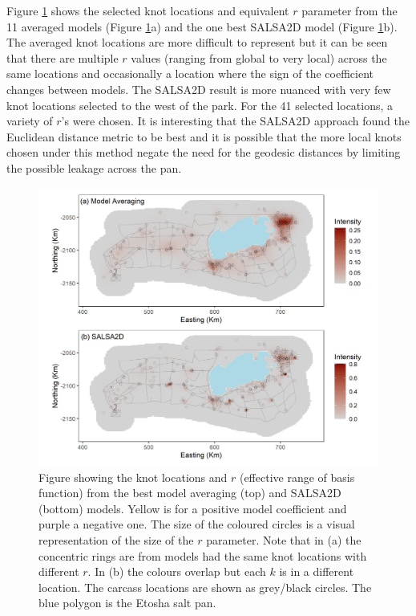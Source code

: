 \documentclass[letterpaper, 12pt]{interact}
\begin{document}
	
	Figure \ref{fig:simknots} shows the selected knot locations and equivalent $r$ parameter from the 11 averaged models (Figure \ref{fig:simknots}a) and the one best SALSA2D model (Figure \ref{fig:simknots}b). The averaged knot locations are more difficult to represent but it can be seen that there are multiple $r$ values (ranging from global to very local) across the same locations and occasionally a location where the sign of the coefficient changes between models. The SALSA2D result is more nuanced with very few knot locations selected to the west of the park. For the 41 selected locations, a variety of $r$'s were chosen. It is interesting that the SALSA2D approach found the Euclidean distance metric to be best and it is possible that the more local knots chosen under this method negate the need for the geodesic distances by limiting the possible leakage across the pan.  
	
	\begin{figure}[!ht]
		\centering
		\includegraphics[width=0.7\linewidth]{images/Figure4.jpg}
		\caption{Figure showing the knot locations and $r$ (effective range of basis function) from the best model averaging (top) and SALSA2D (bottom) models. Yellow is for a positive model coefficient and purple a negative one. The size of the coloured circles is a visual representation of the size of the $r$ parameter. Note that in (a) the concentric rings are from models had the same knot locations with different $r$. In (b) the colours overlap but each $k$ is in a different location.  The carcass locations are shown as grey/black circles. The blue polygon is the Etosha salt pan.}
		\label{fig:simknots}
	\end{figure}
	
	
	
\end{document}
